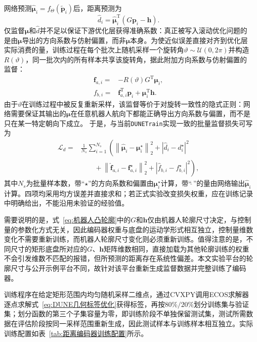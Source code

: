 网络预测$\hat{\boldsymbol\mu}_i=f_{\Theta}(\tilde{\mathbf p}_i)$后，距离预测为
\begin{equation}
	\hat d_i
	=
	\hat{\boldsymbol\mu}_i^{\mathrm T}
	\left(G\mathbf p_i-\mathbf h\right).
	\label{eq:编码器训练距离}
\end{equation}
仅监督$\boldsymbol\mu$和$\hat d$并不足以保证下游优化层获得准确系数：真正被写入滚动优化问题的是由$\boldsymbol\mu$导出的方向系数与仿射偏置，而非$\boldsymbol\mu$本身。为使近似误差直接对齐到优化层实际消费的量，训练过程在每个批次上随机采样一个旋转角$\vartheta\sim\mathcal U(0,2\pi)$并构造$R(\vartheta)$，同一批次内的所有样本共享该旋转角，据此附加方向系数与仿射偏置的监督：
\begin{align}
	\mathbf f_{a,i}
	=&-R(\vartheta)G^{\mathrm T}\boldsymbol\mu_i,
	\label{eq:DUNE方向系数}\\
	f_{b,i}
	=&\mathbf f_{a,i}^{\mathrm T}\mathbf p_i
	+\boldsymbol\mu_i^{\mathrm T}\mathbf h.
	\label{eq:DUNE仿射偏置}
\end{align}
由于$\vartheta$在训练过程中被反复重新采样，该监督等价于对旋转一致性的隐式正则：网络需要保证其输出的$\boldsymbol\mu$在任意机器人航向下都能正确导出方向系数与偏置，而不是只在某一特定朝向下成立。
于是，与当前\texttt{DUNETrain}实现一致的批量监督损失可写为
\begin{align}
	\mathcal L_d
	=&\frac{1}{N_s}\sum_{i=1}^{N_s}
	\left(
	\left\|\hat{\boldsymbol\mu}_i-\boldsymbol\mu_i^{\star}\right\|_2^2
	+\left|\hat d_i-d_i^{\star}\right|^2
	\right.
	\nonumber\\
	&\left.\qquad
	+\left\|\hat{\mathbf f}_{a,i}-\mathbf f_{a,i}^{\star}\right\|_2^2
	+\left|\hat f_{b,i}-f_{b,i}^{\star}\right|^2
	\right),
	\label{eq:距离编码器损失}
\end{align}
其中$N_s$为批量样本数，带“$\star$”的方向系数和偏置由$\boldsymbol\mu_i^{\star}$计算，带“$\hat{\ }$”的量由网络输出$\hat{\boldsymbol\mu}_i$计算。四项均采用均方误差并直接求和；若正式实验改变损失权重，应在训练记录中明确给出，不能沿用未验证的经验值。

需要说明的是，式~\eqref{eq:机器人凸轮廓}中的$G$和$\mathbf h$仅由机器人轮廓尺寸决定，与控制量的参数化方式无关，因此编码器权重与底盘的运动学形式相互独立，控制量维数变化不需要重新训练，而机器人轮廓尺寸变化则必须重新训练。值得注意的是，不同尺寸的矩形底盘所对应的$G$、$\mathbf h$矩阵维数相同，直接加载为其他轮廓训练的权重不会引发维数不匹配的报错，但所预测的距离存在系统性偏差。本文实验平台的轮廓尺寸与公开示例平台不同，故针对该平台重新生成监督数据并完整训练了编码器。

训练程序在给定矩形范围内均匀随机采样二维点，通过CVXPY调用ECOS求解器逐点求解式~\eqref{eq:DUNE几何标签优化}获得标签，再按$80\%/20\%$划分训练集与验证集；划分函数的第三个子集容量为零，即训练阶段不单独保留测试集，测试所需数据在评估阶段按同一采样范围重新生成，因此测试样本与训练样本相互独立。实际训练配置如表~\ref{tab:距离编码器训练配置}所示。

